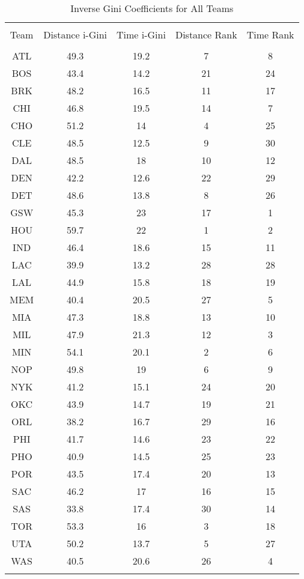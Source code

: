 
\begin{table}[!htbp] \centering 
  \caption{Inverse Gini Coefficients for All Teams} 
  \label{} 
\begin{tabular}{@{\extracolsep{5pt}} ccccc} 
\\[-1.8ex]\hline 
\hline \\[-1.8ex] 
Team & Distance i-Gini & Time i-Gini & Distance Rank & Time Rank \\ 
\hline \\[-1.8ex] 
ATL & 49.3 & 19.2 & 7 & 8 \\ 
BOS & 43.4 & 14.2 & 21 & 24 \\ 
BRK & 48.2 & 16.5 & 11 & 17 \\ 
CHI & 46.8 & 19.5 & 14 & 7 \\ 
CHO & 51.2 & 14 & 4 & 25 \\ 
CLE & 48.5 & 12.5 & 9 & 30 \\ 
DAL & 48.5 & 18 & 10 & 12 \\ 
DEN & 42.2 & 12.6 & 22 & 29 \\ 
DET & 48.6 & 13.8 & 8 & 26 \\ 
GSW & 45.3 & 23 & 17 & 1 \\ 
HOU & 59.7 & 22 & 1 & 2 \\ 
IND & 46.4 & 18.6 & 15 & 11 \\ 
LAC & 39.9 & 13.2 & 28 & 28 \\ 
LAL & 44.9 & 15.8 & 18 & 19 \\ 
MEM & 40.4 & 20.5 & 27 & 5 \\ 
MIA & 47.3 & 18.8 & 13 & 10 \\ 
MIL & 47.9 & 21.3 & 12 & 3 \\ 
MIN & 54.1 & 20.1 & 2 & 6 \\ 
NOP & 49.8 & 19 & 6 & 9 \\ 
NYK & 41.2 & 15.1 & 24 & 20 \\ 
OKC & 43.9 & 14.7 & 19 & 21 \\ 
ORL & 38.2 & 16.7 & 29 & 16 \\ 
PHI & 41.7 & 14.6 & 23 & 22 \\ 
PHO & 40.9 & 14.5 & 25 & 23 \\ 
POR & 43.5 & 17.4 & 20 & 13 \\ 
SAC & 46.2 & 17 & 16 & 15 \\ 
SAS & 33.8 & 17.4 & 30 & 14 \\ 
TOR & 53.3 & 16 & 3 & 18 \\ 
UTA & 50.2 & 13.7 & 5 & 27 \\ 
WAS & 40.5 & 20.6 & 26 & 4 \\ 
\hline \\[-1.8ex] 
\end{tabular} 
\end{table} 
